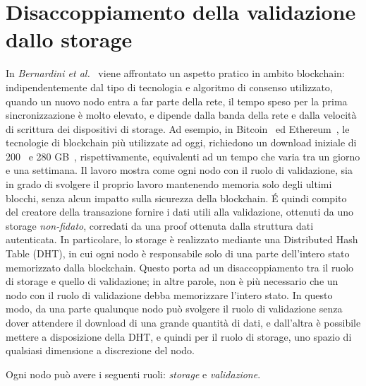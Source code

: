 \section{Disaccoppiamento della validazione dallo storage}\label{sec:bernardini}
In \emph{Bernardini et al.}~\cite{bernardini2019blockchains} viene affrontato un aspetto pratico in ambito blockchain: indipendentemente dal tipo di tecnologia e algoritmo di consenso utilizzato, quando un nuovo nodo entra a far parte della rete, il tempo speso per la prima sincronizzazione è molto elevato, e dipende dalla banda della rete e dalla velocità di scrittura dei dispositivi di storage. Ad esempio, in Bitcoin~\cite{nakamoto2019bitcoin} ed Ethereum~\cite{wood2014ethereum}, le tecnologie di blockchain più utilizzate ad oggi, richiedono un download iniziale di 200~\cite{bitcoin2020fullnode} e 280 GB~\cite{ethereum2020chart}, rispettivamente, equivalenti ad un tempo che varia tra un giorno e una settimana.
Il lavoro mostra come ogni nodo con il ruolo di validazione, sia in grado di svolgere il proprio lavoro mantenendo memoria solo degli ultimi blocchi, senza alcun impatto sulla sicurezza della blockchain. \'E quindi compito del creatore della transazione fornire i dati utili alla validazione, ottenuti da uno storage \emph{non-fidato}, corredati da una proof ottenuta dalla struttura dati autenticata. In particolare, lo storage è realizzato mediante una Distributed Hash Table (DHT), in cui ogni nodo è responsabile solo di una parte dell'intero stato memorizzato dalla blockchain. Questo porta ad un disaccoppiamento tra il ruolo di storage e quello di validazione; in altre parole, non è più necessario che un nodo con il ruolo di validazione debba memorizzare l'intero stato. In questo modo, da una parte qualunque nodo può svolgere il ruolo di validazione senza dover attendere il download di una grande quantità di dati, e dall'altra è possibile mettere a disposizione della DHT, e quindi per il ruolo di storage, uno spazio di qualsiasi dimensione a discrezione del nodo.

Ogni nodo può avere i seguenti ruoli: \emph{storage} e \emph{validazione}.

